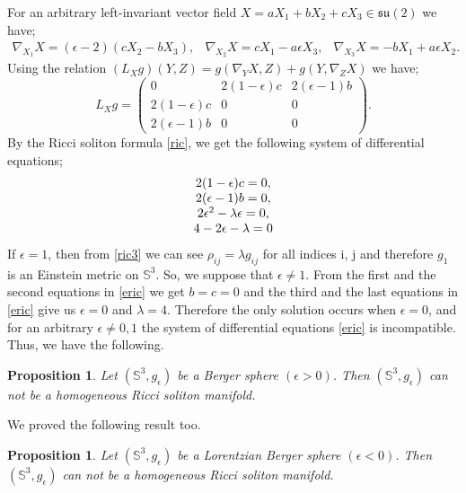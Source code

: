 \documentclass[11pt,oneside,leqno]{amsart}
\theoremstyle{plain}
\newtheorem{prop}[theorem]{Proposition}
\begin{document}
For an arbitrary left-invariant vector field $X =aX_1+bX_2+cX_3\in {{\mathfrak{su}}}(2)$ we have;
$$
 \begin{array}{ccc}
  \nabla_{X_1}X= (\epsilon-2)(cX_2-bX_3) ,& \nabla_{X_2}X=cX_1-a\epsilon X_3 ,& \nabla_{X_3}X=-bX_1+a\epsilon X_2.
     \end{array}
$$
Using the relation $(L_{X}g)(Y,Z) = g(\nabla_Y X,Z) + g(Y,\nabla_ZX)$ we have;
 \begin{equation}\label{kil}
  L_{X}g= \left( \begin{array}{ccc}
   0 & 2(1-\epsilon)c & 2(\epsilon-1)b   \\
   2(1-\epsilon)c & 0 & 0   \\
   2(\epsilon-1)b & 0 & 0  
   \end{array}  \right).
\end{equation}
By the Ricci soliton formula \eqref{ric}, we get the following
system of differential equations;
  \begin{equation}\label{eric}
 \begin{array}{cr} 
    \hspace*{0mm} 2(1-\epsilon)c=0,\\
  \hspace*{0mm} 2(\epsilon-1)b=0,\\
  \hspace*{0mm} 2\epsilon^2-\lambda \epsilon=0,\\
  \hspace*{0mm} 4-2\epsilon-\lambda =0
   \end{array}
\end{equation} 
If $\epsilon=1$, then from \eqref{ric3} we can see $\rho_{ij}=\lambda g_{ij}$ for all indices i, j and therefore $g_1$ is an Einstein metric on ${{\mathbb S}}^3$. So, we suppose that $\epsilon\neq1$. From the first and the second equations in \eqref{eric} we get $b=c=0$ and the third and
the last equations in \eqref{eric} give us $\epsilon=0$ and $\lambda=4$. Therefore the only solution occurs when $\epsilon=0$, and for an arbitrary $\epsilon\neq 0,1$ the system of differential equations \eqref{eric} is incompatible. Thus, we have the following.
\begin{prop}\label{pro1}
Let $({{\mathbb S}}^3, g_{\epsilon})$ be a Berger sphere $(\epsilon >0)$. Then $({{\mathbb S}}^3, g_{\epsilon})$ can not be a homogeneous Ricci soliton manifold.
\end{prop}
We proved the following result too.
\begin{prop}\label{pro2}
Let $({{\mathbb S}}^3, g_{\epsilon})$ be a Lorentzian Berger sphere $(\epsilon<0)$. Then $({{\mathbb S}}^3, g_{\epsilon})$ can not be a homogeneous Ricci soliton manifold.
\end{prop}
\end{document}
